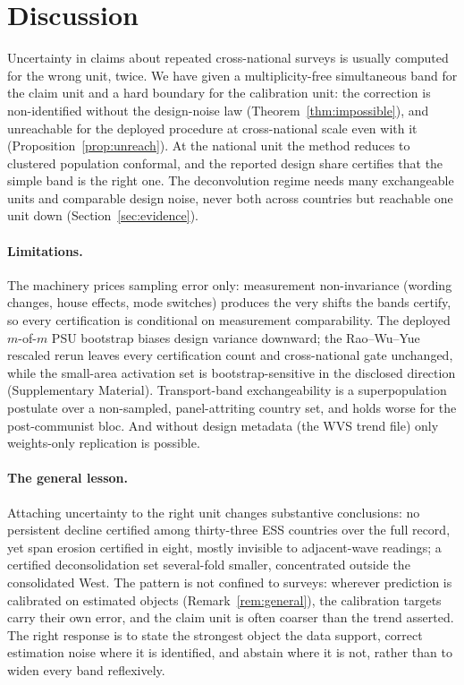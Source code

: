 \section{Discussion}\label{sec:discussion}

Uncertainty in claims about repeated cross-national surveys is usually
computed for the wrong unit, twice. We have given a multiplicity-free
simultaneous band for the claim unit and a hard boundary for the calibration unit: the correction is
non-identified without the design-noise law (Theorem~\ref{thm:impossible}),
and unreachable for the deployed procedure at cross-national scale even with
it (Proposition~\ref{prop:unreach}). At the national unit the method reduces
to clustered population conformal, and the reported design share certifies
that the simple band is the right one. The deconvolution regime needs many
exchangeable units and comparable design noise, never both across countries
but reachable one unit down (Section~\ref{sec:evidence}).

\paragraph{Limitations.} The machinery prices sampling error only: measurement non-invariance
(wording changes, house effects, mode switches) produces the very shifts the
bands certify, so every certification is conditional on measurement
comparability. The
deployed $m$-of-$m$ PSU bootstrap \citep{rao1992recent,wolter2007introduction}
biases design variance downward; the Rao--Wu--Yue rescaled rerun leaves every
certification count and cross-national gate unchanged, while the small-area
activation set is bootstrap-sensitive in the disclosed direction
(Supplementary Material). Transport-band exchangeability is a
superpopulation postulate over a non-sampled, panel-attriting country set,
and holds worse for the post-communist bloc. And without design metadata
(the WVS trend file) only weights-only replication is possible.

\paragraph{The general lesson.} Attaching uncertainty to the right unit
changes substantive conclusions: no persistent decline certified among
thirty-three ESS countries over the full record, yet span erosion certified
in eight, mostly invisible to adjacent-wave readings; a certified
deconsolidation set several-fold smaller, concentrated outside the
consolidated West. The pattern is not confined to surveys: wherever prediction is calibrated on estimated objects
(Remark~\ref{rem:general}), the calibration targets carry their own error,
and the claim unit is often coarser than the trend asserted. The right
response is to state the strongest object the data support, correct
estimation noise where it is identified, and abstain where it is not, rather
than to widen every band reflexively.
